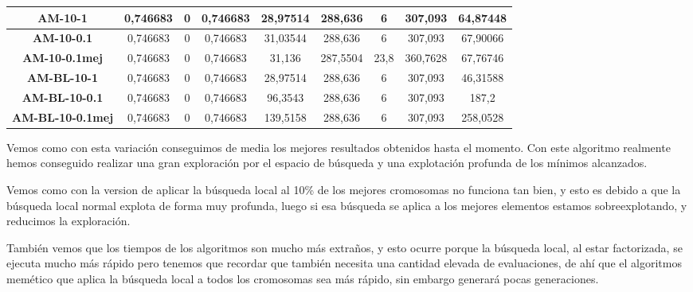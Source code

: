 \documentclass[12pt, spanish]{article}
\begin{document}
\begin{table}[H]
\begin{tabular}{|c|c|c|c|c|c|c|c|c|}
\textbf{AM-10-1}         & 0,746683                  & 0                           & 0,746683               & 28,97514   & 288,636                   & 6                           & 307,093                & 64,87448   \\ \hline
\textbf{AM-10-0.1}       & 0,746683                  & 0                           & 0,746683               & 31,03544   & 288,636                   & 6                           & 307,093                & 67,90066   \\ \hline
\textbf{AM-10-0.1mej}    & 0,746683                  & 0                           & 0,746683               & 31,136     & 287,5504                  & 23,8                        & 360,7628               & 67,76746   \\ \hline
\textbf{AM-BL-10-1}      & 0,746683                  & 0                           & 0,746683               & 28,97514   & 288,636                   & 6                           & 307,093                & 46,31588   \\ \hline
\textbf{AM-BL-10-0.1}    & 0,746683                  & 0                           & 0,746683               & 96,3543    & 288,636                   & 6                           & 307,093                & 187,2      \\ \hline
\textbf{AM-BL-10-0.1mej} & 0,746683                  & 0                           & 0,746683               & 139,5158   & 288,636                   & 6                           & 307,093                & 258,0528   \\ \hline
\end{tabular}
\end{table}


Vemos como con esta variación conseguimos de media los mejores resultados obtenidos hasta el momento. Con este algoritmo realmente hemos conseguido realizar una  gran exploración por el espacio de búsqueda y una explotación profunda de los mínimos alcanzados.

Vemos como con la version de aplicar la búsqueda local al 10\% de los mejores cromosomas no funciona tan bien, y esto es debido a que la búsqueda local normal explota de forma muy profunda, luego si esa búsqueda se aplica a los mejores elementos estamos sobreexplotando, y reducimos la exploración.

También vemos que los tiempos de los algoritmos son mucho más extraños, y esto ocurre porque la búsqueda local, al estar factorizada, se ejecuta mucho más rápido pero tenemos que recordar que también necesita una cantidad elevada de evaluaciones, de ahí que el algoritmos memético que aplica la búsqueda local a todos los cromosomas sea más rápido, sin embargo generará pocas generaciones.
\end{document}
